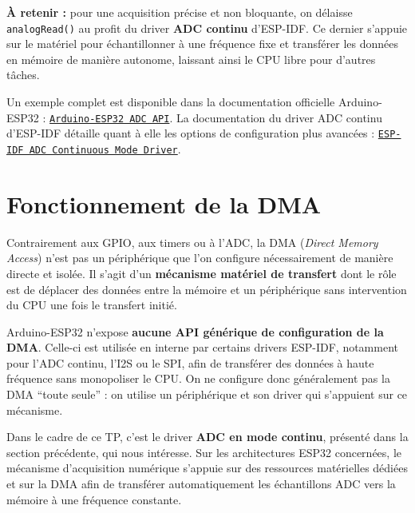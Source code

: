 \begin{imp}
\textbf{À retenir :} pour une acquisition précise et non bloquante, on délaisse \texttt{analogRead()} au profit du driver \textbf{ADC continu} d'ESP-IDF. Ce dernier s'appuie sur le matériel pour échantillonner à une fréquence fixe et transférer les données en mémoire de manière autonome, laissant ainsi le CPU libre pour d'autres tâches.
\end{imp}

Un exemple complet est disponible dans la documentation officielle Arduino-ESP32 : \href{https://docs.espressif.com/projects/arduino-esp32/en/latest/api/adc.html}{\texttt{Arduino-ESP32 ADC API}}. La documentation du driver ADC continu d'ESP-IDF détaille quant à elle les options de configuration plus avancées : \href{https://docs.espressif.com/projects/esp-idf/en/latest/esp32s3/api-reference/peripherals/adc_continuous.html}{\texttt{ESP-IDF ADC Continuous Mode Driver}}. \cite{arduino_adc,esp32s3_adc_continuous}


\section{Fonctionnement de la DMA}

Contrairement aux GPIO, aux timers ou à l'ADC, la DMA (\textit{Direct Memory Access}) n'est pas un périphérique que l'on configure nécessairement de manière directe et isolée. Il s'agit d'un \textbf{mécanisme matériel de transfert} dont le rôle est de déplacer des données entre la mémoire et un périphérique sans intervention du CPU une fois le transfert initié.

\begin{imp}
Arduino-ESP32 n'expose \textbf{aucune API générique de configuration de la DMA}. Celle-ci est utilisée en interne par certains drivers ESP-IDF, notamment pour l'ADC continu, l'I2S ou le SPI, afin de transférer des données à haute fréquence sans monopoliser le CPU. On ne configure donc généralement pas la DMA ``toute seule'' : on utilise un périphérique et son driver qui s'appuient sur ce mécanisme.
\end{imp}

Dans le cadre de ce TP, c'est le driver \textbf{ADC en mode continu}, présenté dans la section précédente, qui nous intéresse. Sur les architectures ESP32 concernées, le mécanisme d'acquisition numérique s'appuie sur des ressources matérielles dédiées et sur la DMA afin de transférer automatiquement les échantillons ADC vers la mémoire à une fréquence constante.

